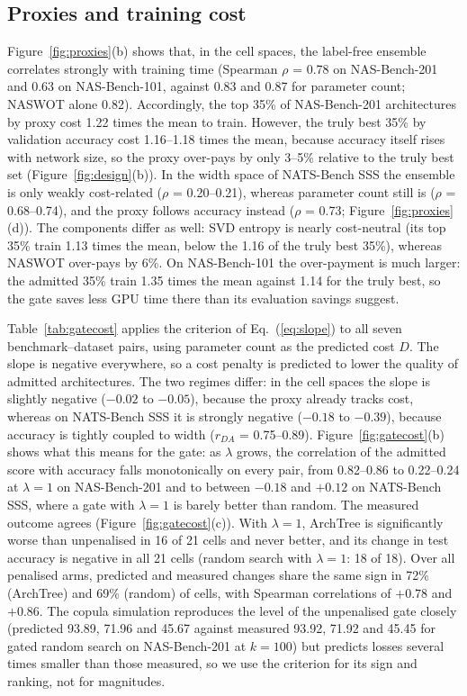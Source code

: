 \documentclass{sadhana}
\newcommand{\algname}{ArchTree}
\begin{document}
\subsection{Proxies and training cost}\label{sec:cost}

Figure~\ref{fig:proxies}(b) shows that, in the cell spaces, the label-free ensemble correlates strongly with training time (Spearman $\rho$ = 0.78 on NAS-Bench-201 and 0.63 on NAS-Bench-101, against 0.83 and 0.87 for parameter count; NASWOT alone 0.82). Accordingly, the top 35\% of NAS-Bench-201 architectures by proxy cost 1.22 times the mean to train. However, the truly best 35\% by validation accuracy cost 1.16--1.18 times the mean, because accuracy itself rises with network size, so the proxy over-pays by only 3--5\% relative to the truly best set (Figure~\ref{fig:design}(b)). In the width space of NATS-Bench SSS the ensemble is only weakly cost-related ($\rho$ = 0.20--0.21), whereas parameter count still is ($\rho$ = 0.68--0.74), and the proxy follows accuracy instead ($\rho$ = 0.73; Figure~\ref{fig:proxies}(d)). The components differ as well: SVD entropy is nearly cost-neutral (its top 35\% train 1.13 times the mean, below the 1.16 of the truly best 35\%), whereas NASWOT over-pays by 6\%. On NAS-Bench-101 the over-payment is much larger: the admitted 35\% train 1.35 times the mean against 1.14 for the truly best, so the gate saves less GPU time there than its evaluation savings suggest.

Table~\ref{tab:gatecost} applies the criterion of Eq.~(\ref{eq:slope}) to all seven benchmark--dataset pairs, using parameter count as the predicted cost $D$. The slope is negative everywhere, so a cost penalty is predicted to lower the quality of admitted architectures. The two regimes differ: in the cell spaces the slope is slightly negative ($-0.02$ to $-0.05$), because the proxy already tracks cost, whereas on NATS-Bench SSS it is strongly negative ($-0.18$ to $-0.39$), because accuracy is tightly coupled to width ($r_{DA}$ = 0.75--0.89). Figure~\ref{fig:gatecost}(b) shows what this means for the gate: as $\lambda$ grows, the correlation of the admitted score with accuracy falls monotonically on every pair, from 0.82--0.86 to 0.22--0.24 at $\lambda=1$ on NAS-Bench-201 and to between $-0.18$ and $+0.12$ on NATS-Bench SSS, where a gate with $\lambda=1$ is barely better than random. The measured outcome agrees (Figure~\ref{fig:gatecost}(c)). With $\lambda=1$, \algname{} is significantly worse than unpenalised in 16 of 21 cells and never better, and its change in test accuracy is negative in all 21 cells (random search with $\lambda=1$: 18 of 18). Over all penalised arms, predicted and measured changes share the same sign in 72\% (\algname) and 69\% (random) of cells, with Spearman correlations of $+0.78$ and $+0.86$. The copula simulation reproduces the level of the unpenalised gate closely (predicted 93.89, 71.96 and 45.67 against measured 93.92, 71.92 and 45.45 for gated random search on NAS-Bench-201 at $k=100$) but predicts losses several times smaller than those measured, so we use the criterion for its sign and ranking, not for magnitudes.
\end{document}
